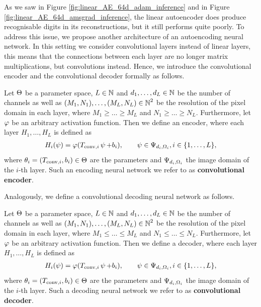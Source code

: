 As we saw in Figure \ref{fig:linear_AE_64d_adam_inference} and in Figure \ref{fig:linear_AE_64d_amsgrad_inference}, the linear autoencoder does produce recognisable digits in its reconstructions, but it still performs quite poorly. To address this issue, we propose another architecture of an autoencoding neural network. In this setting we consider convolutional layers instead of linear layers, this means that the connections between each layer are no longer matrix multiplications, but convolutions instead. Hence, we introduce the convolutional encoder and the convolutional decoder formally as follows.


\begin{definition}\label{def_convolutional_encoder}
Let $\operatorname{\Theta}$ be a parameter space, $L\in \operatorname{\mathbb{N}}$ and $d_1,\ldots, d_L\in\operatorname{\mathbb{N}}$ be the number of channels as well as $(M_1,N_1),\ldots,(M_L,N_L) \in \operatorname{\mathbb{N}}^2$ be the resolution of the pixel domain in each layer, where $M_1\geq \ldots \geq M_L$ and $N_1\geq \ldots \geq N_L$. Furthermore, let $\operatorname{\varphi}$ be an arbitrary activation function. Then we define an encoder, where each layer $H_1,\ldots, H_L$ is defined as
\begin{align*}
H_i(\operatorname{\psi}) = \operatorname{\varphi}(T_{\text{conv}, i}\operatorname{\psi} + b_i), \qquad \operatorname{\psi} \in \Psi_{d_i,\Omega_i}, i \in \{1,\ldots, L\},
\end{align*}
where $\theta_i = (T_{\text{conv}, i}, b_i)\in\operatorname{\Theta}$ are the parameters and $\Psi_{d_i,\Omega_i}$ the image domain of the $i$-th layer. Such an encoding neural network we refer to as \textbf{convolutional encoder}.
\end{definition}

Analogously, we define a convolutional decoding neural network as follows.

\begin{definition}\label{def_convolutional_decoder}
Let $\operatorname{\Theta}$ be a parameter space, $L\in \operatorname{\mathbb{N}}$ and $d_1,\ldots, d_L\in\operatorname{\mathbb{N}}$ be the number of channels as well as $(M_1,N_1),\ldots,(M_L,N_L) \in \operatorname{\mathbb{N}}^2$ be the resolution of the pixel domain in each layer, where $M_1\leq \ldots \leq M_L$ and $N_1\leq \ldots \leq N_L$. Furthermore, let $\operatorname{\varphi}$ be an arbitrary activation function. Then we define a decoder, where each layer $H_1,\ldots, H_L$ is defined as
\begin{align*}
H_i(\operatorname{\psi}) = \operatorname{\varphi}(T_{\text{conv}, i}\operatorname{\psi} + b_i), \qquad \operatorname{\psi} \in \Psi_{d_i,\Omega_i}, i \in \{1,\ldots, L\},
\end{align*}
where $\theta_i = (T_{\text{conv}, i}, b_i)\in\operatorname{\Theta}$ are the parameters and $\Psi_{d_i,\Omega_i}$ the image domain of the $i$-th layer. Such a decoding neural network we refer to as \textbf{convolutional decoder}.
\end{definition}

